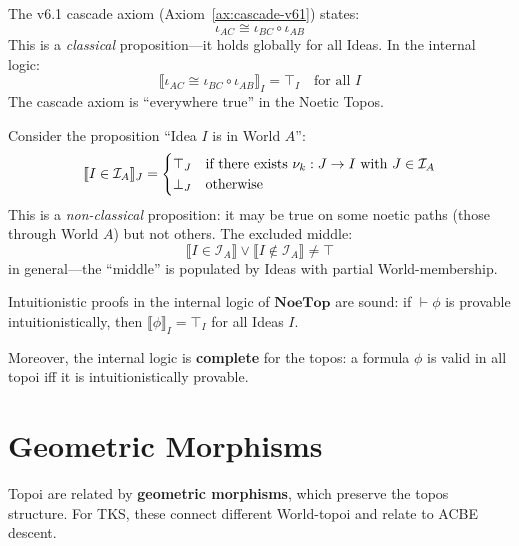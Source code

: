 \begin{example}
\label{ex:acbe-internal}
The v6.1 cascade axiom (Axiom~\ref{ax:cascade-v61}) states:
\[
  \iota_{AC} \cong \iota_{BC} \circ \iota_{AB}
\]
This is a \emph{classical} proposition---it holds globally for all Ideas.
In the internal logic:
\[
  \llbracket \iota_{AC} \cong \iota_{BC} \circ \iota_{AB} \rrbracket_I = \top_I
  \quad \text{for all } I
\]
The cascade axiom is ``everywhere true'' in the Noetic Topos.
\end{example}

\begin{example}
\label{ex:world-relative}
Consider the proposition ``Idea $I$ is in World $A$'':
\[
  \llbracket I \in \mathcal{I}_A \rrbracket_J = \begin{cases}
    \top_J & \text{if there exists } \nu_{k} : J \to I \text{ with } J \in \mathcal{I}_A \\
    \bot_J & \text{otherwise}
  \end{cases}
\]
This is a \emph{non-classical} proposition: it may be true on some noetic paths
(those through World $A$) but not others. The excluded middle:
\[
  \llbracket I \in \mathcal{I}_A \rrbracket \lor \llbracket I \notin \mathcal{I}_A \rrbracket \neq \top
\]
in general---the ``middle'' is populated by Ideas with partial World-membership.
\end{example}

\begin{theorem}
\label{thm:internal-soundness}
Intuitionistic proofs in the internal logic of $\mathbf{NoeTop}$ are sound:
if $\vdash \phi$ is provable intuitionistically, then $\llbracket \phi \rrbracket_I = \top_I$
for all Ideas $I$.

Moreover, the internal logic is \textbf{complete} for the topos: a formula
$\phi$ is valid in all topoi iff it is intuitionistically provable.
\end{theorem}

\section{Geometric Morphisms}
\label{sec:geometric-morphisms}

Topoi are related by \textbf{geometric morphisms}, which preserve the topos
structure. For TKS, these connect different World-topoi and relate to ACBE descent.

